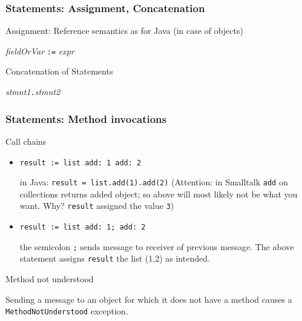 \documentclass{beamer}
\newcommand{\Blue}[1]{\color{blue}#1\color{black}}
\begin{document}

\begin{frame}[fragile]
\frametitle{Statements: Assignment, Concatenation}

\Blue{Assignment}: Reference semantics as for Java (in case of objects)
\begin{center}
\textit{fieldOrVar} \alert{\texttt{:=}} \textit{expr}
\end{center}

\pause\bigskip

\Blue{Concatenation of Statements}

\begin{center}
\textit{stmnt1}{\huge\alert{\texttt{.}}}\textit{stmnt2}
\end{center}

\end{frame}



\begin{frame}[fragile]
\frametitle{Statements: Method invocations}

\Blue{Call chains}

\begin{itemize}
\item<1->
\begin{lstlisting}[language=Smalltalk]
result := list add: 1 add: 2
\end{lstlisting} 
in Java: \texttt{result = list.add(1).add(2)} (Attention: in Smalltalk
\texttt{add} on collections returns added object; so above will most
likely not be what you want. Why?  \texttt{result} assigned the
value \texttt{3}) 
\item<2-> 
\begin{lstlisting}[language=Smalltalk]
result := list add: 1; add: 2
\end{lstlisting} 
the semicolon \texttt{;} sends message to receiver of previous
message. The above statement assigns \texttt{result} the list (1,2) as intended.

\end{itemize}


\Blue{Method not understood}

Sending a message to an object for which it does not have a method
causes a \texttt{MethodNotUnderstood} exception.


\end{frame}
\end{document}
